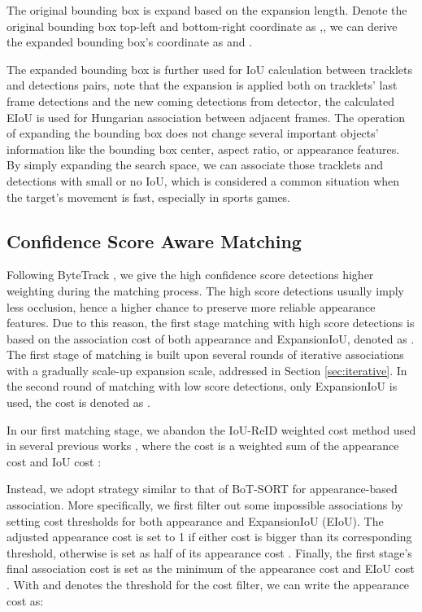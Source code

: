 \documentclass[10pt,twocolumn,letterpaper]{article}
\begin{document}
The original bounding box is expand based on the expansion length. Denote the original bounding box top-left and bottom-right coordinate as ,, we can derive the expanded bounding box's coordinate as  and . 

The expanded bounding box is further used for IoU calculation between tracklets and detections pairs, note that the expansion is applied both on tracklets' last frame detections and the new coming detections from detector, the calculated EIoU is used for Hungarian association between adjacent frames. The operation of expanding the bounding box does not change several important objects' information like the bounding box center, aspect ratio, or appearance features. By simply expanding the search space, we can associate those tracklets and detections with small or no IoU, which is considered a common situation when the target's movement is fast, especially in sports games.

\subsection{Confidence Score Aware Matching}
Following ByteTrack \cite{ByteTrack}, we give the high confidence score detections higher weighting during the matching process. The high score detections usually imply less occlusion, hence a higher chance to preserve more reliable appearance features. Due to this reason, the first stage matching with high score detections is based on the association cost of both appearance and ExpansionIoU, denoted as . The first stage of matching is built upon several rounds of iterative associations with a gradually scale-up expansion scale, addressed in Section \ref{sec:iterative}. In the second round of matching with low score detections, only ExpansionIoU is used, the cost is denoted as . 

In our first matching stage, we abandon the IoU-ReID weighted cost method used in several previous works \cite{FairMOT,DeepSORT}, where the cost is a weighted sum of the appearance cost  and IoU cost :



Instead, we adopt strategy similar to that of BoT-SORT \cite{aharon2022bot} for appearance-based association.  More specifically, we first filter out some impossible associations by setting cost thresholds for both appearance and ExpansionIoU (EIoU). The adjusted appearance cost  is set to 1 if either cost is bigger than its corresponding threshold, otherwise  is set as half of its appearance cost . Finally, the first stage's final association cost  is set as the minimum of the appearance cost  and EIoU cost . With  and  denotes the threshold for the cost filter, we can write the appearance cost  as:
\end{document}
